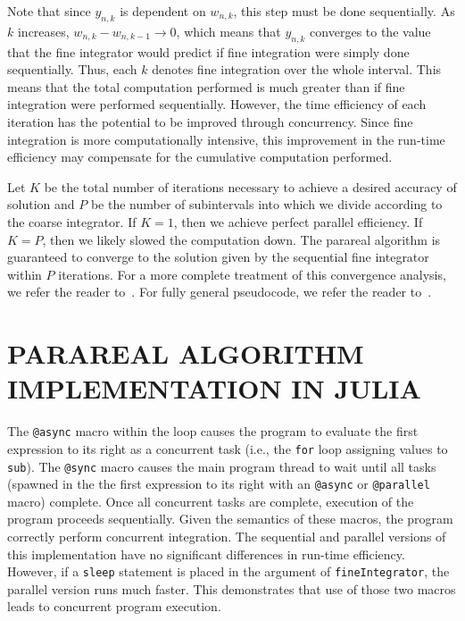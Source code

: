 \documentclass[12pt]{article}
\begin{document}
\noindent Note that since $y_{n,k}$ is dependent on $w_{n,k}$, this step must
be done sequentially. As $k$ increases, $w_{n,k} - w_{n,k-1} \to 0$, which
means that $y_{n,k}$ converges to the value that the fine integrator would
predict if fine integration were simply done sequentially. Thus, each $k$
denotes fine integration over the whole interval. This means that the total 
computation performed is much greater than if fine integration were performed
sequentially.  However, the time efficiency of each iteration has the potential
to be improved through concurrency. Since fine integration is more
computationally intensive, this improvement in the run-time efficiency may
compensate for the cumulative computation performed.

Let $K$ be the total number of iterations necessary to achieve a desired
accuracy of solution and $P$ be the number of subintervals into which we divide 
according to the coarse integrator. If $K=1$, then we achieve perfect parallel
efficiency. If $K = P$, then we likely slowed the computation down. The
parareal algorithm is guaranteed to converge to the solution given by the
sequential fine integrator within $P$ iterations. For a more complete treatment
of this convergence analysis, we refer the reader to~\cite{Gander:2007}. For fully
general pseudocode, we refer the reader to~\cite{Aubanel:2011,Nielsen:2012}. 

\section*{\normalsize PARAREAL ALGORITHM IMPLEMENTATION IN JULIA}

The \texttt{@async} macro within the loop causes the program to
evaluate the first expression to its right as a concurrent task (i.e., the
\texttt{for} loop assigning values to \texttt{sub}).  The \texttt{@sync} macro
causes the main program thread to wait until all tasks (spawned in the the
first expression to its right with an \texttt{@async} or \texttt{@parallel}
macro) complete.  Once all concurrent tasks are complete, execution of the
program proceeds sequentially. Given the semantics of these macros, the program
correctly perform concurrent integration.  The sequential and parallel versions
of this implementation have no significant differences in run-time efficiency.
However, if a \texttt{sleep} statement is placed in the argument of
\texttt{fineIntegrator}, the parallel version runs much faster.  This
demonstrates that use of those two macros leads to concurrent program
execution.
\end{document}
